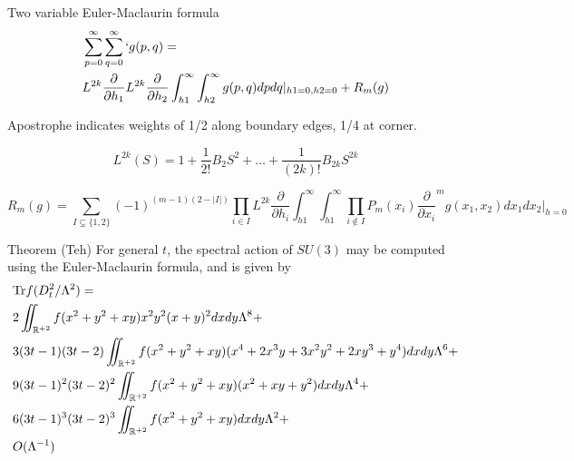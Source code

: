 \documentclass{beamer}
\def\R{{\mathbb R}}
\def\Tr{{\rm Tr}}
\begin{document}
\begin{frame}
  \begin{block}{Two variable Euler-Maclaurin formula}
    \begin{align*}
      &\sum_{p=0}^{\infty} \sum_{q=0}^{\infty} ` g(p,q) =\\
      &L^{2k} \frac{\partial}{\partial h_1}L^{2k} \frac{\partial}{\partial h_2} \int_{h1}^{\infty} \int_{h2}^{\infty} g(p,q)dpdq|_{h1=0, h2 = 0} + R_m(g) \\
    \end{align*}

    {\tiny
    Apostrophe indicates weights of 1/2 along boundary edges, 1/4 at corner.

    \[
      L^{2k}(S) = 1 + \frac{1}{2!}B_2S^2+ \ldots + \frac{1}{(2k)!} B_{2k}S^{2k}
    \]
    
    \[
      R_m(g) = \sum_{I \subsetneq \{1,2\}}(-1)^{(m-1)(2-|I|)}\prod_{i\in I} L^{2k} \frac{\partial}{\partial h_i} \int_{h1}^{\infty}\int_{h1}^{\infty} \prod_{i \notin I} P_m(x_i) \frac{\partial}{\partial x_i} ^m g(x_1,x_2)dx_1 dx_2 |_{h=0}
    \]
    }
  \end{block}
\end{frame}

\begin{frame}
	\begin{block}{Theorem (Teh)}
	For general $t$, the spectral action of $SU(3)$ may be computed using the Euler-Maclaurin formula, and is given by
		{\tiny
		\begin{align*}
	 		&\Tr f(D_t^2/ \Lambda^2) = \\
			& 2 \iint_{\R ^{+2}} f (x^2 + y^2 + xy)x^2y^2(x+y)^2 dxdy \Lambda^8 +\\
			&3(3t-1)(3t-2)\iint_{\R ^{+2}}f(x^2+y^2+xy)(x^4+2x^3y+3x^2y^2+2xy^3 +y^4)dxdy\Lambda^6 +\\
			&9(3t-1)^2(3t-2)^2\iint_{\R ^{+2}}f(x^2 + y^2+xy)(x^2+xy+y^2)dxdy\Lambda^4 +\\
			&6(3t-1)^3(3t-2)^3 \iint_{\R ^{+2}} f(x^2 + y^2 +xy)dxdy \Lambda^2+ \\
			&O(\Lambda^{-1})
		\end{align*}
		}
	\end{block}
\end{frame}
\end{document}
